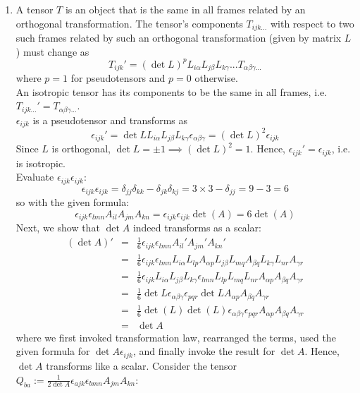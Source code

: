\documentclass[a4paper]{article}
\begin{document}
\begin{ans}\leavevmode
\begin{enumerate}[label=(\roman*)]
\item A tensor $T$ is an object that is the same in all frames related by an orthogonal transformation. The tensor's components $T_{ijk...}$ with respect to two such frames related by such an orthogonal transformation (given by matrix $L$) must change as 
$$T_{ijk}'=(\det L)^pL_{i\alpha}L_{j\beta}L_{k\gamma}...T_{\alpha\beta\gamma...}$$
where $p=1$ for pseudotensors and $p=0$ otherwise.\\[5pt]
An isotropic tensor has its components to be the same in all frames, i.e. $T_{ijk...}'=T_{\alpha\beta\gamma...}$.\\[5pt]
$\epsilon_{ijk}$ is a pseudotensor and transforms as
$$\epsilon_{ijk}'=\det L L_{i\alpha}L_{j\beta}L_{k\gamma}\epsilon_{\alpha\beta\gamma}=(\det L)^2\epsilon_{ijk}$$
Since $L$ is orthogonal, $\det L=\pm1\implies(\det L)^2=1$. Hence, $\epsilon_{ijk}'=\epsilon_{ijk}$, i.e. is isotropic.\\[5pt]
Evaluate $\epsilon_{ijk}\epsilon_{ijk}$:
$$\epsilon_{ijk}\epsilon_{ijk}=\delta_{jj}\delta_{kk}-\delta_{jk}\delta_{kj}=3\times 3-\delta_{jj}=9-3=6$$
so with the given formula:
$$\epsilon_{ijk}\epsilon_{lmn}A_{il}A_{jm}A_{kn}=\epsilon_{ijk}\epsilon_{ijk}\det(A)=6\det (A)$$
Next, we show that $\det A$ indeed transforms as a scalar:
\begin{eqnarray}
(\det A)'&=&\frac{1}{6}\epsilon_{ijk}\epsilon_{lmn}A_{il}'A_{jm}'A_{kn}'\nonumber\\&=&\frac{1}{6}\epsilon_{ijk}\epsilon_{lmn}L_{i\alpha}L_{lp}A_{\alpha p}L_{j\beta}L_{mq}A_{\beta q}L_{k\gamma}L_{nr}A_{\gamma r}\nonumber\\&=&\frac{1}{6}\epsilon_{ijk}L_{i\alpha}L_{j\beta}L_{k\gamma}\epsilon_{lmn}L_{lp}L_{mq}L_{nr}A_{\alpha p}A_{\beta q}A_{\gamma r}\nonumber\\&=&\frac{1}{6}\det L\epsilon_{\alpha\beta\gamma}\epsilon_{pqr}\det LA_{\alpha p}A_{\beta q}A_{\gamma r}\nonumber\\&=&\frac{1}{6}\det(L)\det(L)\epsilon_{\alpha\beta\gamma}\epsilon_{pqr}A_{\alpha p}A_{\beta q}A_{\gamma r}\nonumber\\&=&\det A \nonumber
\end{eqnarray}
where we first invoked transformation law, rearranged the terms, used the given formula for $\det A\epsilon_{ijk}$, and finally invoke the result for $\det A$. Hence, $\det A$ transforms like a scalar. Consider the tensor $Q_{ba}:=\frac{1}{2\det A}\epsilon_{ajk}\epsilon_{bmn}A_{jm}A_{kn}$:

\end{enumerate}
\end{ans}
\end{document}
